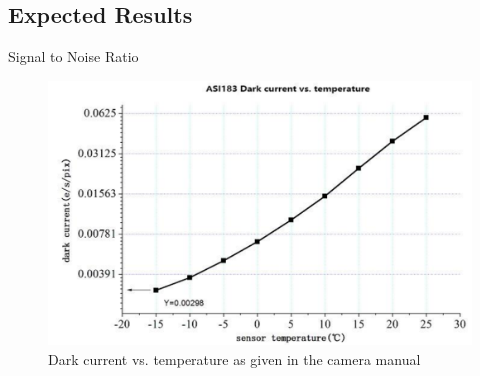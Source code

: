 \documentclass[11pt, aspectratio=169]{beamer}
\begin{document}
\subsection{Expected Results}
\begin{frame}{Signal to Noise Ratio}
\begin{figure}[!htb]
    \hspace{-2cm}
    \begin{minipage}{0.6\textwidth}
        \centering
        \includegraphics[width=0.9\linewidth]{figures/images/darkcurrent.PNG}
        \caption{Dark current vs. temperature as given in the camera manual}
    \end{minipage}%
    \begin{minipage}{0.2\textwidth}
	 	\centering

\end{minipage}
\end{figure}
\end{frame}
\end{document}
